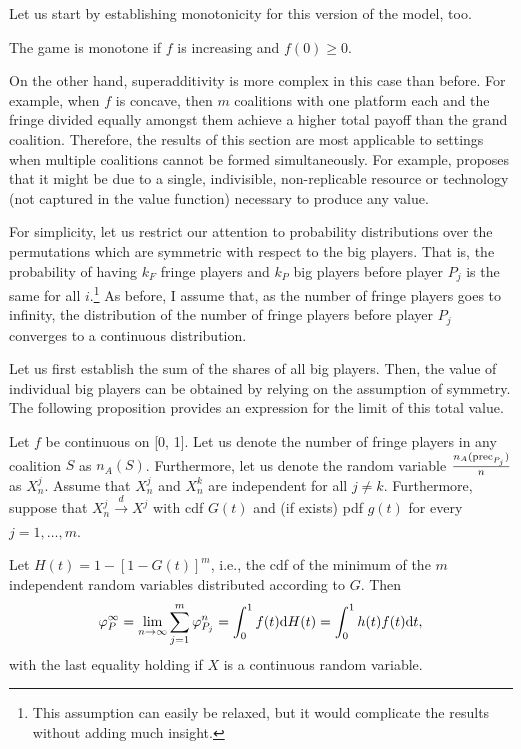 Let us start by establishing monotonicity for this version of the model, too.
\begin{proposition}
    The game is monotone if $f$ is increasing and $f(0) \geq 0$.
\end{proposition}
On the other hand, superadditivity is more complex in this case than before.
For example, when $f$ is concave, then $m$ coalitions with one platform each and the fringe divided equally amongst them achieve a higher total payoff than the grand coalition.
Therefore, the results of this section are most applicable to settings when multiple coalitions cannot be formed simultaneously.
For example, \textcite{hart1996bargaining} proposes that it might be due to a single, indivisible, non-replicable resource or technology (not captured in the value function) necessary to produce any value.

For simplicity, let us restrict our attention to probability distributions over the permutations which are symmetric with respect to the big players.
That is, the probability of having $k_F$ fringe players and $k_P$ big players before player $P_j$ is the same for all $i$.\footnote{
 This assumption can easily be relaxed, but it would complicate the results without adding much insight.
}
As before, I assume that, as the number of fringe players goes to infinity, the distribution of the number of fringe players before player $P_j$ converges to a continuous distribution.

Let us first establish the sum of the shares of all big players.
Then, the value of individual big players can be obtained by relying on the assumption of symmetry.
The following proposition provides an expression for the limit of this total value.
\begin{theorem}
    \label{prop:multiple_platforms_total}
    Let $f$ be continuous on [0, 1].
    Let us denote the number of fringe players in any coalition $S$ as $n_A(S)$.
    Furthermore, let us denote the random variable $\frac{n_A(\mathrm{prec}_{P_j})}{n}$ as $X_n^j$.
    Assume that $X_n^j$ and $X_n^k$ are independent for all $j \neq k$.
    Furthermore, suppose that $X_n^j \xrightarrow[]{d} X^j$ with cdf $G(t)$ and (if exists) pdf $g(t)$ for every $j = 1, \dots, m$.

    Let $H(t) = 1 - [1 - G(t)]^m$, i.e., the cdf of the minimum of the $m$ independent random variables distributed according to $G$.
    Then
    \begin{align*}
        \varphi_P^\infty = \lim_{n \to \infty} \sum_{j=1}^m \varphi_{P_j}^n = \int_0^1 f(t) \mathrm{d}H(t) = \int_0^1 h(t) f(t) \mathrm{d}t,
    \end{align*}
    with the last equality holding if $X$ is a continuous random variable.
\end{theorem}


